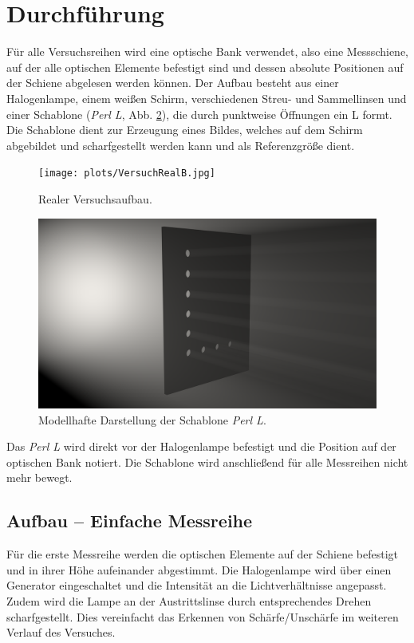 \section{Durchführung}
\label{sec:Durchführung}

Für alle Versuchsreihen wird eine optische Bank verwendet, also eine Messschiene, auf der alle optischen Elemente befestigt sind und dessen absolute Positionen auf der Schiene
abgelesen werden können. Der Aufbau besteht aus einer Halogenlampe, einem weißen Schirm, verschiedenen Streu- und Sammellinsen und einer Schablone (\textit{Perl L}, Abb. \ref{fig:PerlL}), die durch
punktweise Öffnungen ein L formt. Die Schablone dient zur Erzeugung eines Bildes, welches auf dem Schirm abgebildet und scharfgestellt werden kann und als Referenzgröße dient.

\begin{figure}
    \centering
    \texttt{[image: plots/VersuchRealB.jpg]}
    \caption{Realer Versuchsaufbau.}
    \label{fig:VersuchReal}
\end{figure}

\begin{figure}
    \centering
    \includegraphics[width=.7\textwidth]{plots/PerlL.png}
    \caption{Modellhafte Darstellung der Schablone \textit{Perl L}.}
    \label{fig:PerlL}
\end{figure}

Das \textit{Perl L} wird direkt vor der Halogenlampe befestigt und die Position auf der optischen Bank notiert. Die Schablone wird anschließend für alle Messreihen nicht mehr bewegt.

\subsection{Aufbau -- Einfache Messreihe}
Für die erste Messreihe werden die optischen Elemente auf der Schiene befestigt und in ihrer Höhe aufeinander abgestimmt. Die Halogenlampe wird über einen Generator eingeschaltet und die Intensität an die
Lichtverhältnisse angepasst. Zudem wird die Lampe an der Austrittslinse durch entsprechendes Drehen scharfgestellt. Dies vereinfacht das Erkennen von Schärfe/Unschärfe im weiteren
Verlauf des Versuches.

